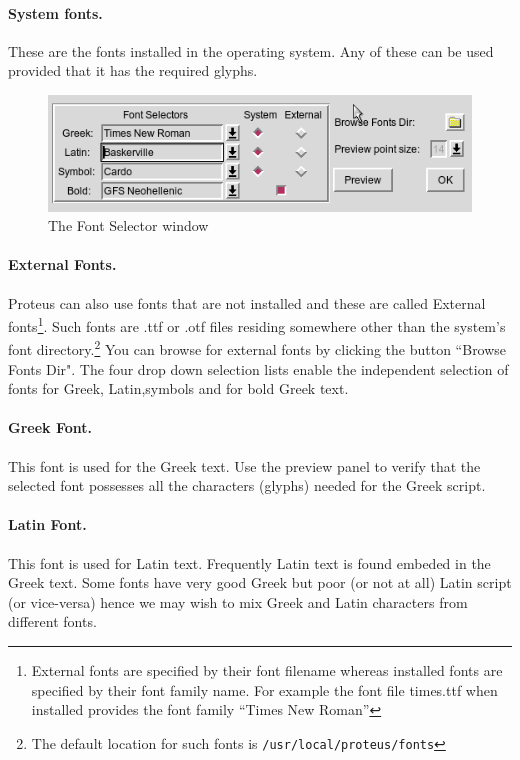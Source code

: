 \documentclass[11pt,a4paper]{article}
\begin{document}
    \paragraph{System fonts.} These are the fonts installed in the operating system.
      Any of these can be used provided that it has the required glyphs.
    \begin{figure}[htb]
      \begin{center}
        \includegraphics[scale=0.6]{../images/font-selector.png}
        \caption{The Font Selector window}
      \end{center}
    \end{figure}
    \paragraph{External Fonts.} Proteus can also use fonts that are not installed and these
    are called External fonts\footnote{External fonts are specified by their font
      filename whereas installed fonts are specified by their font family name.
    For example the font file times.ttf when installed provides the font family ``Times New Roman'' }. Such fonts are .ttf or .otf files residing
    somewhere other than the system's font directory.\footnote{
                          The default location for such fonts is
                        {\tt /usr/local/proteus/fonts}}
    You can browse for external fonts by clicking the button ``Browse Fonts Dir".
    The four drop down selection lists enable the independent selection of fonts for
    Greek, Latin,symbols and for bold Greek text.
    \paragraph{Greek Font.}This font is used for the Greek text. Use the preview panel
     to verify that the selected font possesses all the characters (glyphs) needed
     for the Greek script.
    \paragraph{Latin Font.}This font is used for Latin text.
      Frequently Latin text
      is found embeded in the Greek text.  Some fonts have very good
      Greek but poor (or not at all) Latin script (or vice-versa)
      hence we may wish to mix Greek and Latin characters from different fonts.
\end{document}
